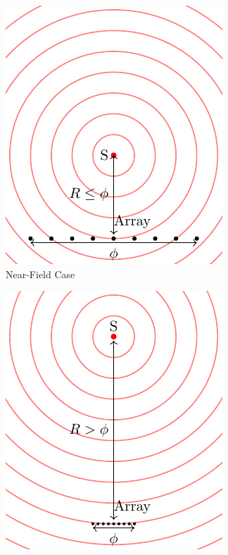 \begin{figure}
  \centering
  \begin{subfigure}[b]{0.45\textwidth}
    \centering
    \includegraphics[width=\textwidth]{NearField.pdf}
    \caption{Near-Field Case}
    \label{fig:y equals x}
  \end{subfigure}
  \hfill
  \begin{subfigure}[b]{0.45\textwidth}
    \centering
    \includegraphics[width=\textwidth]{FarField.pdf}

\end{subfigure}
\end{figure}
